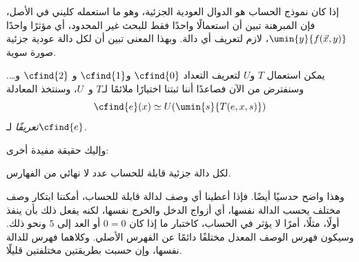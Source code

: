 \documentclass[../../../include/open-logic-section]{subfiles}
\begin{document}
إذا كان نموذج الحساب هو الدوال العودية الجزئية، وهو ما استعمله كليني
في الأصل، فإن المبرهنة تبين أن استعمالًا واحدًا فقط للبحث غير المحدود،
أي مؤثرًا واحدًا $\umin{y}{f(\vec x,y)}$، لازم لتعريف أي دالة. وبهذا
المعنى تبين أن لكل دالة عودية جزئية صورة سوية.

يمكن استعمال $T$ و$U$ لتعريف التعداد $\cfind{0}$ و$\cfind{1}$ و
$\cfind{2}$ و…. وسنفترض من الآن فصاعدًا أننا ثبتنا اختيارًا ملائمًا
لـ$T$ و~$U$، وسنتخذ المعادلة
\[
\cfind{e}(x) \simeq U(\umin{s}{T(e,x,s)})
\]
\emph{تعريفًا} لـ$\cfind{e}$.

وإليك حقيقة مفيدة أخرى:

\begin{thm}
لكل دالة جزئية قابلة للحساب عدد لا نهائي من الفهارس.
\end{thm}

وهذا واضح حدسيًا أيضًا. فإذا أعطينا أي وصف لدالة قابلة للحساب، أمكننا
ابتكار وصف مختلف يحسب الدالة نفسها، أي أزواج الدخل والخرج نفسها، لكنه
يفعل ذلك بأن ينفذ أولًا، مثلًا، أمرًا لا يؤثر في الحساب، كاختبار ما إذا
كان $0=0$ أو العد إلى $5$ ونحو ذلك. وسيكون فهرس الوصف المعدل مختلفًا
دائمًا عن الفهرس الأصلي. وكلاهما فهرس للدالة نفسها، وإن حسبت بطريقتين
مختلفتين قليلًا.
\end{document}
